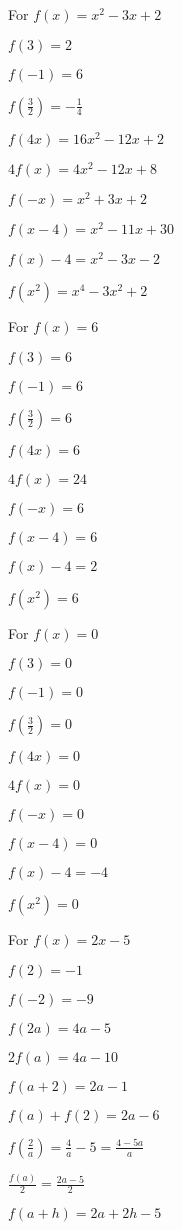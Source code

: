 \begin{tasks}
\task For $f(x) = x^2 - 3x + 2$ 

\begin{shortitemize}
\item $f(3) = 2$
\item $f(-1) = 6$
\item $f\left(\frac{3}{2} \right) = -\frac{1}{4}$
\item  $f(4x) = 16x^2-12x+2$
\item $4f(x) = 4x^2-12x+8$
\item $f(-x) = x^2+3x+2$
\item  $f(x-4) = x^2-11x+30$
\item $f(x) - 4 = x^2-3x-2$
\item  $f\left(x^2\right) = x^4-3x^2+2$
\end{shortitemize}

\task For $f(x) = 6$ 

\begin{shortitemize}
\item $f(3) = 6$
\item $f(-1) =6$
\item $f\left(\frac{3}{2} \right) = 6$
\item  $f(4x) = 6$
\item $4f(x) = 24$
\item $f(-x) = 6$
\item  $f(x-4) = 6$ 
\item $f(x) - 4 = 2$
\item  $f\left(x^2\right) = 6$
\end{shortitemize}

\task For $f(x) = 0$ 

\begin{shortitemize}
\item $f(3) = 0$
\item $f(-1) =0$
\item $f\left(\frac{3}{2} \right) = 0$
\item  $f(4x) = 0$
\item $4f(x) = 0$
\item $f(-x) = 0$
\item  $f(x-4) = 0$ 
\item $f(x) - 4 = -4$
\item  $f\left(x^2\right) = 0$
\end{shortitemize}

\task For $f(x) = 2x-5$

\begin{shortitemize}
\item  $f(2) = -1$
\item  $f(-2) = -9$
\item  $f(2a) = 4a-5$
\item  $2 f(a) = 4a-10$
\item $f(a+2) = 2a-1$
\item $f(a) + f(2) = 2a-6$
\item  $f \left( \frac{2}{a} \right) = \frac{4}{a} - 5 = \frac{4-5a}{a}$
\item $\frac{f(a)}{2} =\frac{2a-5}{2}$
\item  $f(a + h) = 2a + 2h - 5$
\end{shortitemize}


\end{tasks}
